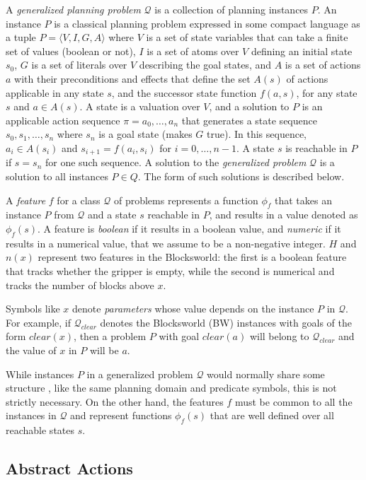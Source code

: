 \documentclass[letterpaper]{article} %
\newcommand{\tup}[1]{\langle #1 \rangle}
\newcommand{\Q}{\mathcal{Q}}
\begin{document}
A \emph{generalized planning problem} $\Q$ is a collection of planning instances $P$.
An instance $P$ is a  classical planning problem expressed in some compact language
as a tuple $P=\tup{V,I,G,A}$ where $V$ is a set of state variables that can take a
finite set of values (boolean or not), $I$ is a set of atoms over $V$ defining an
initial state $s_0$, $G$ is a set of literals over $V$ describing the goal
states, and $A$ is a set of actions $a$ with their preconditions and effects that
define the set $A(s)$ of actions applicable in any state $s$, and the successor
state function $f(a,s)$, for any state $s$ and $a \in A(s)$.
A state is a valuation over $V$, and a solution to $P$ is an applicable action
sequence $\pi=a_0,\ldots,a_n$ that generates  a state sequence $s_0,s_1,\ldots,s_{n}$
where $s_n$ is a goal state (makes $G$ true). In this sequence, $a_i \in A(s_i)$
and $s_{i+1}=f(a_i,s_i)$ for $i=0, \ldots, n-1$. A state $s$ is reachable in $P$
if $s=s_n$ for one such sequence. A solution to the \emph{generalized problem}
$\Q$ is a solution to all instances $P \in Q$. The form of such solutions is
described below.

A \emph{feature} $f$ for a class $\Q$ of problems represents a function $\phi_f$
that takes an   instance $P$ from $\Q$ and a state $s$ reachable in $P$, and results
in a value denoted as $\phi_f(s)$. 
A feature is \emph{boolean} if it results in a boolean value, and \emph{numeric}
if it results in a numerical value, that we assume to be a non-negative integer.
$H$ and $n(x)$ represent two features in the Blocksworld:
the first is a boolean feature that tracks whether the gripper is empty, while
the second is numerical and tracks the number of blocks above $x$. 

Symbols like $x$ denote \emph{parameters} whose value depends on the
instance $P$ in $\Q$. For example, if $\Q_{clear}$ denotes the Blocksworld (BW)
instances with goals of the form $clear(x)$, then a problem 
$P$ with goal $clear(a)$ will belong to $\Q_{clear}$ and 
the value of $x$ in $P$ will be $a$.

While instances $P$ in a generalized problem $\Q$ would normally share some structure \cite{bonet:ijcai2015},
like the same planning domain and predicate symbols, this is not strictly  necessary.
On the other hand,  the features $f$  must be common to all the instances  in $\Q$ and 
represent functions $\phi_f(s)$ that are well defined over all reachable states $s$.


\subsection{Abstract Actions}
\end{document}
